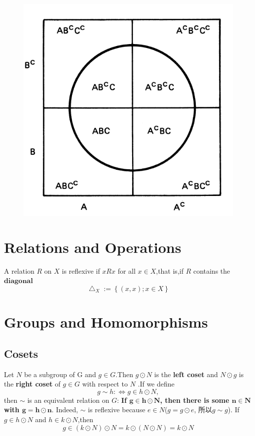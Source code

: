 \documentclass[12pt]{book}
\theoremstyle{definition}\newtheorem{dfn}{Définition}[chapter]
\theoremstyle{plain}\newtheorem{thm}{Théorème}[chapter]
\theoremstyle{plain}\newtheorem{prp}{Proposition}[chapter]
\theoremstyle{plain}\newtheorem{lem}{\bf Lemme}[chapter]
\theoremstyle{plain}\newtheorem{axm}{\bf Axiome}[chapter]
\theoremstyle{plain}\newtheorem{lmm}{\bf Lemme}[chapter]
\theoremstyle{plain}\newtheorem{exm}{\bf Example}[chapter]
\theoremstyle{plain}\newtheorem{cor}{\bf Corollaire}[chapter]
\theoremstyle{remark}\newtheorem{rem}{Remarque}[chapter]
\begin{document}
\begin{figure}
\includegraphics[scale=0.5]{image//Probabilite//1}
\end{figure}


\chapter{Relations and Operations}
A relation $R$ on $X$ is reflexive if $xRx$ for all $x\in X$,that is,if $R$ contains the $\mathbf{diagonal}$
$$
\bigtriangleup_{X} :=\left \{ (x,x);x\in X \right \}
$$




\chapter{Groups and Homomorphisms}
\section{Cosets}
Let $N$ be a subgroup of G
and $g\in G$.Then $g\odot N$ is the \textbf{left coset} and $N\odot g$ is the \textbf{right coset} of $g\in G$ with respect to $N$ .If we define
$$
g\sim h:\Longleftrightarrow g\in h\odot N
,$$
then $\sim$ is an equivalent relation on $G$:
\textbf{If $\mathbf{g\in h\odot N}$, then there is some $\mathbf{n\in N}$ with $\mathbf{g=h\odot n}$}. Indeed, $\sim$ is reflexive because $e\in N$($g=g\odot e$, 所以$g\sim g$). If $g\in h\odot N$ and $h\in k\odot N$,then
$$
g\in (k\odot N)\odot N=k\odot (N\odot N)=k\odot N
$$
\end{document}
